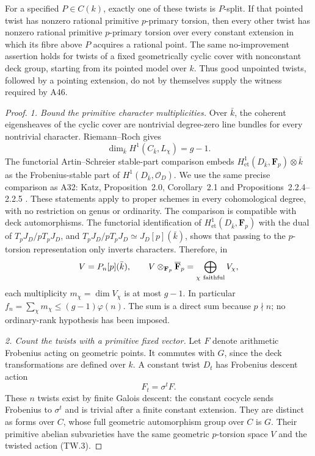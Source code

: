 \documentclass[11pt,a4paper]{article}
\begin{document}
For a specified $P\in C(k)$, exactly one of these twists is
$P$-split. If that pointed twist has nonzero rational primitive
$p$-primary torsion, then every other twist has nonzero rational
primitive $p$-primary torsion over every constant extension in
which its fibre above $P$ acquires a rational point.
The same no-improvement assertion holds for twists of a fixed
geometrically cyclic cover with nonconstant deck group, starting
from its pointed model over $k$.
Thus good unpointed twists, followed by a pointing extension,
do not by themselves supply the witness required by A46.

\begin{proof}
\emph{1. Bound the primitive character multiplicities.}
Over $\bar k$, the coherent eigensheaves of the cyclic cover are
nontrivial degree-zero line bundles for every nontrivial
character. Riemann--Roch gives
\[
             \dim_{\bar k}H^1(C_{\bar k},L_\chi)=g-1.
 \tag{TW.2}
\]
The functorial Artin--Schreier stable-part comparison embeds
$H^1_{\mathrm{et}}(D_{\bar k},\mathbf F_p)\otimes\bar k$
as the Frobenius-stable part of $H^1(D_{\bar k},\mathcal O_D)$.
We use the same precise comparison as A32: Katz,
Proposition~2.0, Corollary~2.1 and Propositions~2.2.4--2.2.5
\cite{KatzCongruence}. These statements apply to proper schemes
in every cohomological degree, with no restriction on genus or
ordinarity. The comparison is compatible with deck automorphisms.
The functorial identification of $H^1_{\mathrm{et}}(D_{\bar k},
\mathbf F_p)$ with the dual of $T_pJ_D/pT_pJ_D$, and
$T_pJ_D/pT_pJ_D\simeq J_D[p](\bar k)$, shows that passing to
the $p$-torsion representation only inverts characters. Therefore,
in
\[
 V=P_n[p](\bar k),\qquad
 V\otimes_{\mathbf F_p}\overline{\mathbf F}_p
                    =\bigoplus_{\chi\ {\rm faithful}}V_\chi,
\]
each multiplicity $m_\chi=\dim V_\chi$ is at most $g-1$.
In particular $f_n=\sum_\chi m_\chi\le(g-1)\varphi(n)$.
The sum is a direct sum because $p\nmid n$; no ordinary-rank
hypothesis has been imposed.

\emph{2. Count the twists with a primitive fixed vector.}
Let $F$ denote arithmetic Frobenius acting on geometric points.
It commutes with $G$, since the deck transformations are defined
over $k$. A constant twist $D_t$ has Frobenius descent action
\[
                           F_t=\sigma^t F.
 \tag{TW.3}
\]
These $n$ twists exist by finite Galois descent: the constant
cocycle sends Frobenius to $\sigma^t$ and is trivial after a
finite constant extension. They are distinct as forms over $C$,
whose full geometric automorphism group over $C$ is $G$.
Their primitive abelian subvarieties have the same geometric
$p$-torsion space $V$ and the twisted action (TW.3).


\end{proof}
\end{document}
